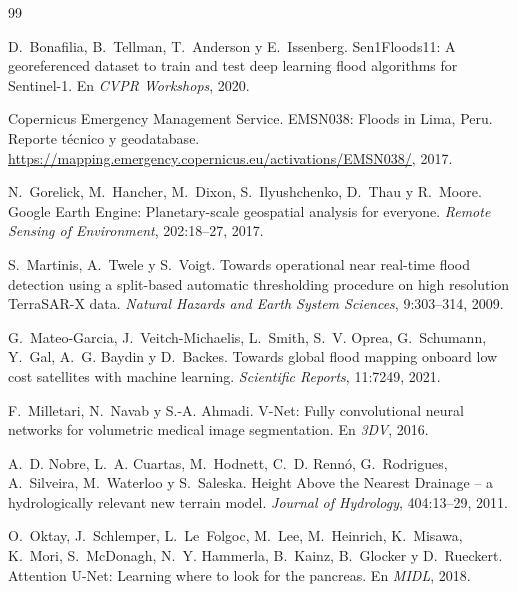 \documentclass{article}
\begin{document}
\small
\begin{thebibliography}{99}

D.~Bonafilia, B.~Tellman, T.~Anderson y E.~Issenberg.
\newblock Sen1Floods11: A georeferenced dataset to train and test deep learning flood algorithms for Sentinel-1.
\newblock En \emph{CVPR Workshops}, 2020.

Copernicus Emergency Management Service.
\newblock EMSN038: Floods in Lima, Peru. Reporte técnico y geodatabase.
\newblock \url{https://mapping.emergency.copernicus.eu/activations/EMSN038/}, 2017.

N.~Gorelick, M.~Hancher, M.~Dixon, S.~Ilyushchenko, D.~Thau y R.~Moore.
\newblock Google Earth Engine: Planetary-scale geospatial analysis for everyone.
\newblock \emph{Remote Sensing of Environment}, 202:18--27, 2017.

S.~Martinis, A.~Twele y S.~Voigt.
\newblock Towards operational near real-time flood detection using a split-based automatic thresholding procedure on high resolution TerraSAR-X data.
\newblock \emph{Natural Hazards and Earth System Sciences}, 9:303--314, 2009.

G.~Mateo-Garcia, J.~Veitch-Michaelis, L.~Smith, S.~V. Oprea, G.~Schumann, Y.~Gal, A.~G. Baydin y D.~Backes.
\newblock Towards global flood mapping onboard low cost satellites with machine learning.
\newblock \emph{Scientific Reports}, 11:7249, 2021.

F.~Milletari, N.~Navab y S.-A. Ahmadi.
\newblock V-Net: Fully convolutional neural networks for volumetric medical image segmentation.
\newblock En \emph{3DV}, 2016.

A.~D. Nobre, L.~A. Cuartas, M.~Hodnett, C.~D. Rennó, G.~Rodrigues, A.~Silveira, M.~Waterloo y S.~Saleska.
\newblock Height Above the Nearest Drainage -- a hydrologically relevant new terrain model.
\newblock \emph{Journal of Hydrology}, 404:13--29, 2011.

O.~Oktay, J.~Schlemper, L.~Le~Folgoc, M.~Lee, M.~Heinrich, K.~Misawa, K.~Mori, S.~McDonagh, N.~Y. Hammerla, B.~Kainz, B.~Glocker y D.~Rueckert.
\newblock Attention U-Net: Learning where to look for the pancreas.
\newblock En \emph{MIDL}, 2018.


\end{thebibliography}
\end{document}

